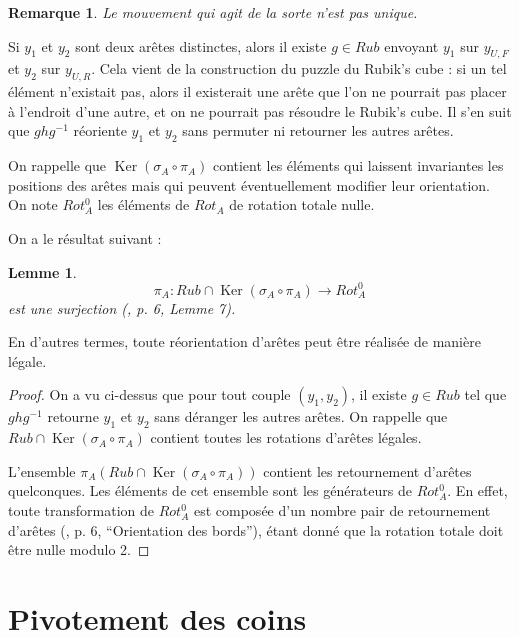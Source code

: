 \documentclass[french]{report}
\newtheorem*{remark}{Remarque}
\newtheorem*{lemma}{Lemme}
\begin{document}
\begin{remark}
Le mouvement qui agit de la sorte n'est pas unique.
\end{remark}

Si $y_1$ et $y_2$ sont deux arêtes distinctes, alors il existe $g \in Rub$ envoyant $y_1$ sur $y _{U,F}$ et $y_2$ sur $y _{U,R}$. Cela vient de la construction du puzzle du Rubik's cube : si un tel élément n'existait pas, alors il existerait une arête que l'on ne pourrait pas placer à l'endroit d'une autre, et on ne pourrait pas résoudre le Rubik's cube. Il s'en suit que $g h g ^{-1} $ réoriente $y_1$ et $y_2$ sans permuter ni retourner les autres arêtes.

On rappelle que $\operatorname{Ker}(\sigma_A \circ \pi_A)$ contient les éléments qui laissent invariantes les positions des arêtes mais qui peuvent éventuellement modifier leur orientation. On note $Rot_A ^{0} $ les éléments de $Rot_A$ de rotation totale nulle.

On a  le résultat suivant :

\begin{lemma} \label{lemme-orientation-coins}
  $$ \pi_A : Rub \cap \operatorname{Ker}(\sigma_A \circ \pi_A ) \to Rot_A ^{0} $$ est une surjection (\cite{colmez_rubik}, p. 6, Lemme 7).
\end{lemma}

En d'autres termes, toute réorientation d'arêtes peut être réalisée de manière légale.

\begin{proof}


  On a vu ci-dessus que pour tout couple $(y_1, y_2)$, il existe $g \in Rub$ tel que $g h g ^{-1} $ retourne $y_1$ et $y_2$ sans déranger les autres arêtes. On rappelle que $Rub \cap \operatorname{Ker}(\sigma _{A} \circ \pi_A)$ contient toutes les rotations d'arêtes légales.

  L'ensemble $\pi_A(Rub \cap \operatorname{Ker}(\sigma_A \circ \pi_A))$ contient les retournement d'arêtes quelconques. Les éléments de cet ensemble sont les générateurs de $Rot_A ^{0}$. En effet, toute transformation de $Rot_A ^{0}$ est composée d'un nombre pair de retournement d'arêtes (\cite{colmez_rubik}, p. 6, ``Orientation des bords''), étant donné que la rotation totale doit être nulle modulo 2.

\end{proof}

\section{Pivotement des coins}
\end{document}
